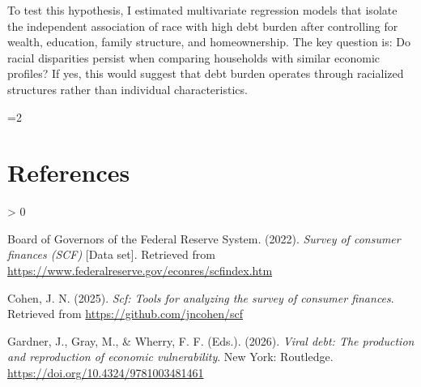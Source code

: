 \documentclass[12pt]{article}
\newcommand{\jncmaincolumns}{1}
\newlength{\cslhangindent}
\providecommand{\citeproctext}{}
\newenvironment{CSLReferences}[2]
 {%
  \ifnum\jncmaincolumns=2\relax\onecolumn\fi
  \section*{References}
  \begin{list}{}{%
   \setlength{\itemindent}{0pt}
   \setlength{\leftmargin}{0pt}
   \setlength{\parsep}{0pt}
   \ifodd #1
    \setlength{\leftmargin}{\cslhangindent}
    \setlength{\itemindent}{-\cslhangindent}
   \fi
   \ifnum #2 > 0
    \setlength{\itemsep}{#2\baselineskip}
   \else
    \setlength{\itemsep}{0pt}
   \fi
  }%
  \renewcommand{\bibitem}[2][]{\item}
 }
 {\end{list}}
\begin{document}
To test this hypothesis, I estimated multivariate regression models that
isolate the independent association of race with high debt burden after
controlling for wealth, education, family structure, and homeownership.
The key question is: Do racial disparities persist when comparing
households with similar economic profiles? If yes, this would suggest
that debt burden operates through racialized structures rather than
individual characteristics.

\label{refs}
\begin{CSLReferences}{1}{0}
\bibitem[\citeproctext]{ref-FederalReserve2022}
Board of Governors of the Federal Reserve System. (2022). \emph{Survey
of consumer finances (SCF)} {[}Data set{]}. Retrieved from
\url{https://www.federalreserve.gov/econres/scfindex.htm}

\bibitem[\citeproctext]{ref-Cohen2025}
Cohen, J. N. (2025). \emph{Scf: Tools for analyzing the survey of
consumer finances}. Retrieved from \url{https://github.com/jncohen/scf}

\bibitem[\citeproctext]{ref-Wherry2026}
Gardner, J., Gray, M., \& Wherry, F. F. (Eds.). (2026). \emph{Viral
debt: The production and reproduction of economic vulnerability}. New
York: Routledge. \url{https://doi.org/10.4324/9781003481461}

\end{CSLReferences}

\clearpage
\end{document}
